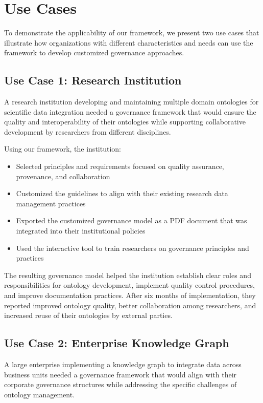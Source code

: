 \documentclass[conference]{IEEEtran}
\begin{document}
\section{Use Cases}
\label{sec:use_cases}

To demonstrate the applicability of our framework, we present two use cases that illustrate how organizations with different characteristics and needs can use the framework to develop customized governance approaches.

\subsection{Use Case 1: Research Institution}

A research institution developing and maintaining multiple domain ontologies for scientific data integration needed a governance framework that would ensure the quality and interoperability of their ontologies while supporting collaborative development by researchers from different disciplines.

Using our framework, the institution:

\begin{itemize}
    \item Selected principles and requirements focused on quality assurance, provenance, and collaboration
    \item Customized the guidelines to align with their existing research data management practices
    \item Exported the customized governance model as a PDF document that was integrated into their institutional policies
    \item Used the interactive tool to train researchers on governance principles and practices
\end{itemize}

The resulting governance model helped the institution establish clear roles and responsibilities for ontology development, implement quality control procedures, and improve documentation practices. After six months of implementation, they reported improved ontology quality, better collaboration among researchers, and increased reuse of their ontologies by external parties.

\subsection{Use Case 2: Enterprise Knowledge Graph}

A large enterprise implementing a knowledge graph to integrate data across business units needed a governance framework that would align with their corporate governance structures while addressing the specific challenges of ontology management.
\end{document}
